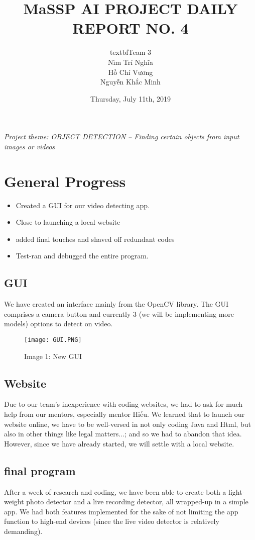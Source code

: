 \documentclass{article}
\title{\textbf{MaSSP AI PROJECT DAILY REPORT NO. 4}}
\author{textbf{Team 3}\\
Nìm Trí Nghĩa\\
Hồ Chí Vương\\
Nguyễn Khắc Minh
}
\date{Thursday, July 11th, 2019}
\begin{document}
\maketitle
\textit{Project theme: OBJECT DETECTION – Finding certain objects from input images or videos} 
\graphicspath{ {./images/} }

\section{General Progress}
\begin{itemize}
	\item{Created a GUI for our video detecting app.}
	\item{Close to launching a local website}
	\item{added final touches and shaved off redundant codes}
	\item{Test-ran and debugged the entire program.}
\end{itemize}

\subsection{GUI}
We have created an interface mainly from the OpenCV library. The GUI comprises a camera button and currently 3 (we will be implementing more models) options to detect on video. 

\begin{figure}[h!]
	\texttt{[image: GUI.PNG]}
	\caption*{Image 1: New GUI}
	\label{GUI}
\end{figure}

\subsection{Website}
Due to our team's inexperience with coding websites, we had to ask for much help from our mentors, especially mentor Hiếu. We learned that to launch our website online, we have to be well-versed in not only coding Java and Html, but also in other things like legal matters...; and so we had to abandon that idea. However, since we have already started, we will settle with a local website.

\subsection{final program}
After a week of research and coding, we have been able to create both a  light-weight photo detector and a live recording detector, all wrapped-up in a simple app. We had both features implemented for the sake of not limiting the app function to high-end devices (since the live video detector is relatively demanding).
\end{document}
